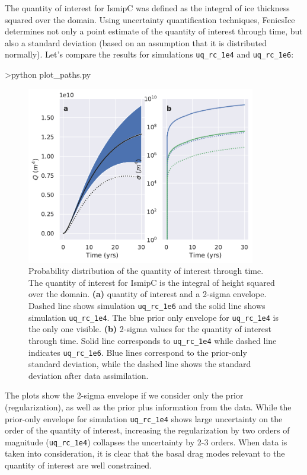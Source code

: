 \documentclass[11pt, reqno, nocenter]{article}
\begin{document}
The quantity of interest for IsmipC was defined as the integral of ice thickness squared over the domain. Using uncertainty quantification techniques, FenicsIce determines not only a point estimate of the quantity of interest through time, but also a standard deviation (based on an assumption that it is distributed normally). Let's compare the results for simulations {\tt uq\_rc\_1e4} and {\tt uq\_rc\_1e6}:

\begin{spverbatim}
>python plot_paths.py
\end{spverbatim}

\begin{figure}[!htbp]
  \centering
  \includegraphics[width=10cm]{./figures/run_paths.pdf}
  \caption[Quantity of Interest through Time]{Probability distribution of the quantity of interest through time. The quantity of interest for IsmipC is the integral of height squared over the domain. \textbf{(a)} quantity of interest and a 2-sigma envelope.  Dashed line shows simulation {\tt uq\_rc\_1e6} and the solid line shows simulation {\tt uq\_rc\_1e4}.  The blue prior only envelope for {\tt uq\_rc\_1e4} is the only one visible. \textbf{(b)} 2-sigma values for the quantity of interest through time. Solid line corresponds to {\tt uq\_rc\_1e4} while dashed line indicates {\tt uq\_rc\_1e6}. Blue lines correspond to the prior-only standard deviation, while the dashed line shows the standard deviation after data assimilation.}
      \label{fig:run_paths}
\end{figure}

The plots show the 2-sigma envelope if we consider only the prior (regularization), as well as the prior plus information from the data. While the prior-only envelope for simulation {\tt uq\_rc\_1e4} shows large uncertainty on the order of the quantity of interest, increasing the regularization by two orders of magnitude ({\tt uq\_rc\_1e4}) collapses the uncertainty by 2-3 orders. When data is taken into consideration, it is clear that the basal drag modes relevant to the quantity of interest are well constrained.
\end{document}
